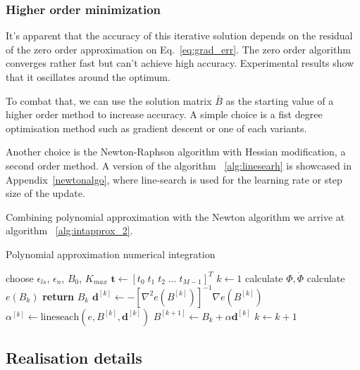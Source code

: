 \documentclass[11pt]{report}
\begin{document}
    \subsubsection{Higher order minimization}
    It's apparent that the accuracy of this iterative solution depends on the residual of the zero order
    approximation on Eq.~\eqref{eq:grad_err}.
    The zero order algorithm converges rather fast but can't achieve high accuracy.
    Experimental results show that it oscillates around the optimum.

    To combat that, we can use the solution matrix $\bar B$ as the starting value of a higher order method to
    increase accuracy.
    A simple choice is a fist degree optimisation method such as gradient descent or one of each variants.

    Another choice is the Newton-Raphson algorithm with Hessian modification, a second order method.
    A version of the algorithm ~\ref{alg:linesearh} is showcased in Appendix~\ref{newtonalgo}, where line-search is used for the learning
    rate or step size of the update.

    Combining polynomial approximation with the Newton algorithm we arrive at algorithm ~\ref{alg:intapprox_2}.

    \begin{algorithm}
        \caption{Polynomial approximation numerical integration}
        \begin{algorithmic}
            \State choose $\epsilon_{ls}$, $\epsilon_{n}$, $B_0$, $K_{max}$
            \State $\pmb{t} \gets [t_0 \; t_1 \; t_2 \; \dots \; t_{M-1} ]^T$
            \State $k \gets 1$
            \State calculate $\Phi, \dot\Phi$
            \Repeat
                \State calculate $e(B_k)$
                    \State \textbf{return} $B_k$
                \EndIf
                \State $ \pmb{d}^{[k]} \gets -\left[ \nabla^2 e(B^{[k]}) \right]^{-1} \nabla e(B^{[k]})$
                \State $ \alpha^{[k]} \gets \text{lineseach}(e, B^{[k]}, \pmb{d}^{[k]}) $
                \State $ B^{[k+1]} \gets B_k + \alpha \pmb{d}^{[k]}$
                \State $k \gets k+1$
        \end{algorithmic}
        \label{alg:intapprox_2}
    \end{algorithm}

    \subsection{Realisation details}
\end{document}

